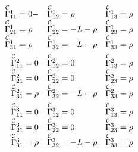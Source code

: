 \documentclass[main.tex]{subfiles}
\begin{document}
\begin{enumerate}[(1)]
    \begin{align}
    \begin{array}{lll}
        \Gammac{1}{11}=0-& \Gammac{1}{12}=\rho&
        \Gammac{1}{13}=\rho\\
        \Gammac{1}{21}=\rho&
        \Gammac{1}{22}=-L-\rho&
        \Gammac{1}{23}=\rho\\
        \Gammac{1}{31}=\rho&
        \Gammac{1}{32}=-L-\rho&
        \Gammac{1}{33}=\rho
    \end{array}
    \\\begin{array}{lll}
        \Gammac{2}{11}=0&
        \Gammac{2}{12}=0&
        \Gammac{2}{13}=\rho\\
        \Gammac{2}{21}=0&
        \Gammac{2}{22}=0&
        \Gammac{2}{23}=\rho\\
        \Gammac{2}{31}=\rho&
        \Gammac{2}{32}=-L-\rho&
        \Gammac{2}{33}=\rho
    \end{array}
    \\\begin{array}{lll}
        \Gammac{3}{11}=0&
        \Gammac{3}{12}=0&
        \Gammac{3}{13}=\rho\\
        \Gammac{3}{21}=0&
        \Gammac{3}{22}=0&
        \Gammac{3}{23}=\rho\\
        \Gammac{3}{31}=\rho&
        \Gammac{3}{32}=-L-\rho&
        \Gammac{3}{33}=\rho
    \end{array}
    \end{align}
     
\end{enumerate}
\end{document}
